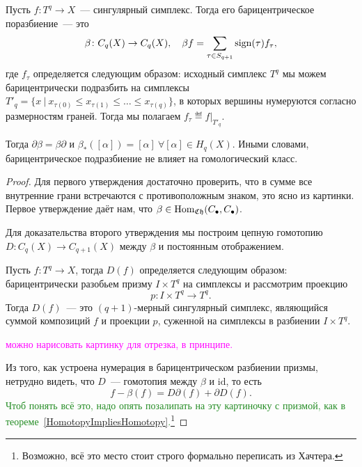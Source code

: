     \begin{lemma}\label{BaricentrLemma}
        Пусть $f\colon T^q \to X$~--- сингулярный симплекс. Тогда его барицентрическое поразбиение~--- это
        \[ \beta\colon C_{q}(X) \to C_{q}(X), \quad  \beta f = \sum_{\tau \in S_{q + 1}}\operatorname{sign}(\tau) f_{\tau}, \]
        где $f_{\tau}$ определяется следующим образом: исходный симплекс $T^{q}$ мы можем барицентрически подразбить на симплексы $T'_{q} = \{ x \ \vert \ x_{\tau(0)} \le x_{\tau(1)} \le \ldots \le x_{\tau(q)}\}$,
        в которых вершины нумеруются согласно размерностям граней. Тогда мы полагаем  $f_{\tau} \eqdef f\vert_{T'_{q}}$.

        Тогда $\partial \beta = \beta \partial$ и  $\beta_{*}([\alpha]) = [\alpha] \ \forall [\alpha] \in H_{q}(X)$. Иными словами,
        барицентрическое подразбиение не влияет на гомологический класс.
    \end{lemma}

    \begin{proof}
        Для первого утверждения достаточно проверить, что в сумме все внутренние грани встречаются с противоположным знаком, это ясно из картинки.
        Первое утверждение даёт нам, что $\beta \in \operatorname{Hom}_{\mathfrak{C}\mathfrak{h}}(C_{\bullet}, C_{\bullet})$.

        Для доказательства второго утверждения мы построим цепную гомотопию $D\colon C_{q}(X) \to C_{q + 1}(X)$ между $\beta$ и постоянным отображением.

        Пусть $f\colon T^{q} \to X$, тогда $D(f)$ определяется следующим образом:
        барицентрически разобьем призму $I \times T^{q}$ на симплексы и рассмотрим проекцию
        \[ p\colon I \times T^q \to T^q. \]
        Тогда $D(f)$~--- это $(q + 1)$-мерный сингулярный симплекс, являющийся суммой композиций $f$ и проекции $p$, суженной на симплексы в разбиении $I \times T^{q}$.
        \begin{center}
            \textcolor{magenta}{можно нарисовать картинку для отрезка, в принципе.}
        \end{center}

        Из того, как устроена нумерация в барицентрическом разбиении призмы, нетрудно видеть, что $D$~--- гомотопия между $\beta$ и $\mathrm{id}$,
        то есть
        \[ f - \beta(f) = D \partial(f) + \partial D(f).  \]
        \textcolor{ForestGreen}{Чтоб понять всё это, надо опять позалипать на эту картиночку с призмой, как в теореме~\ref{HomotopyImpliesHomotopy}.}\footnote{Возможно, всё это место стоит строго формально переписать из Хачтера.}
    \end{proof}


